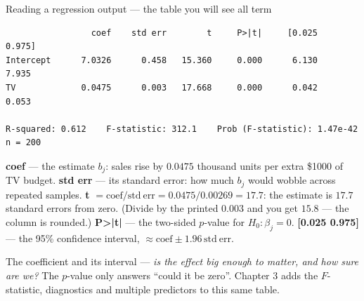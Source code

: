 \documentclass[aspectratio=169,11pt]{beamer}
\begin{document}
\begin{frame}[fragile]{Reading a regression output --- the table you will see all term}
  \scriptsize
\begin{lstlisting}
                 coef    std err        t     P>|t|     [0.025    0.975]
Intercept      7.0326      0.458   15.360     0.000      6.130     7.935
TV             0.0475      0.003   17.668     0.000      0.042     0.053

R-squared: 0.612    F-statistic: 312.1    Prob (F-statistic): 1.47e-42    n = 200
\end{lstlisting}
  \begin{readme}
    \textbf{coef} --- the estimate $b_j$: sales rise by $0.0475$ thousand
    units per extra \$1000 of TV budget.
    \textbf{std err} --- its standard error: how much $b_j$ would wobble
    across repeated samples.
    \textbf{t} $= \mathrm{coef}/\mathrm{std\ err} = 0.0475/0.00269 = 17.7$:
    the estimate is $17.7$ standard errors from zero. (Divide by the printed
    $0.003$ and you get $15.8$ --- the column is rounded.)
    \textbf{P>|t|} --- the two-sided $p$-value for $H_0:\beta_j = 0$.
    \textbf{[0.025 0.975]} --- the 95\% confidence interval, $\approx
    \mathrm{coef} \pm 1.96\,\mathrm{std\ err}$.
  \end{readme}
  \begin{takeaway}
    The coefficient and its interval --- \emph{is the effect big enough to
    matter, and how sure are we?} The $p$-value only answers ``could it be
    zero''. Chapter 3 adds the $F$-statistic, diagnostics and multiple
    predictors to this same table.
  \end{takeaway}
\end{frame}
\end{document}
